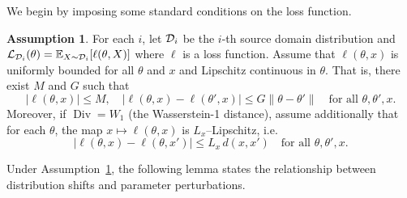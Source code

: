 \documentclass{article}
\theoremstyle{plain}
\theoremstyle{definition}
\newtheorem{assumption}[theorem]{Assumption}
\theoremstyle{remark}
\DeclareMathOperator{\Div}{Div}
\begin{document}
We begin by imposing some standard conditions on the loss function. 

\begin{assumption}\label{ass:ell}
 For each $i$, let ${\mathcal{D}}_i$ be the $i$-th source domain distribution and ${\mathcal{L}}_{{\mathcal{D}}_i}(\theta) = \mathbb{E}_{X\sim {\mathcal{D}}_i}[\ell(\theta,X)]$ where $\ell$ is a loss function. Assume that $\ell(\theta, x)$ is uniformly bounded for all $\theta$ and $x$ and Lipschitz continuous in $\theta$. That is, there exist $M$ and $G$ such that 
\[
  |\ell(\theta, x)|\leq M,\quad |\ell(\theta, x)-\ell(\theta', x)|\leq G\|\theta-\theta'\|
  \quad\text{for all }\theta,\theta', x.
\]
Moreover, if \(\Div=W_1\) (the Wasserstein-1 distance), assume additionally that for each \(\theta\), the map \(x\mapsto\ell(\theta, x)\) is \(L_x\)–Lipschitz, i.e.
\[
  |\ell(\theta, x)-\ell(\theta, x')|\le L_x\,d(x,x')
  \quad\text{for all }\theta,\theta', x.  
\]
\end{assumption}


Under Assumption~\ref{ass:ell}, the following lemma states the relationship between distribution shifts and parameter perturbations. 
\end{document}

